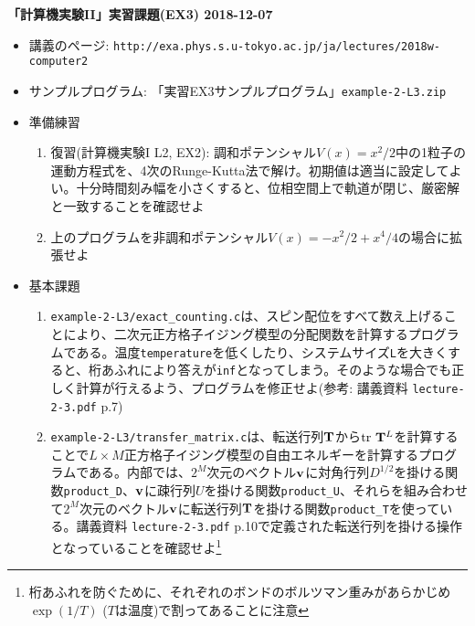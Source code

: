 \documentclass{jarticle}
\begin{document}
\noindent
{\bf\large 「計算機実験II」実習課題(EX3) 2018-12-07}
\\[-0.5em]

\noindent
\begin{itemize}
\item 講義のページ: \verb+http://exa.phys.s.u-tokyo.ac.jp/ja/lectures/2018w-computer2+

\item サンプルプログラム: 「実習EX3サンプルプログラム」{\tt example-2-L3.zip}

\item 準備練習


\begin{enumerate}
\item 復習(計算機実験I L2, EX2): 調和ポテンシャル$V(x)=x^2/2$中の1粒子の運動方程式を、4次のRunge-Kutta法で解け。初期値は適当に設定してよい。十分時間刻み幅を小さくすると、位相空間上で軌道が閉じ、厳密解と一致することを確認せよ
\item 上のプログラムを非調和ポテンシャル$V(x)=-x^2/2+x^4/4$の場合に拡張せよ
\end{enumerate}

\item 基本課題
  \begin{enumerate}
  \item {\tt example-2-L3/exact\_counting.c}は、スピン配位をすべて数え上げることにより、二次元正方格子イジング模型の分配関数を計算するプログラムである。温度{\tt temperature}を低くしたり、システムサイズ{\tt L}を大きくすると、桁あふれにより答えが{\tt inf}となってしまう。そのような場合でも正しく計算が行えるよう、プログラムを修正せよ(参考: 講義資料 {\tt lecture-2-3.pdf} p.7)
  \item {\tt example-2-L3/transfer\_matrix.c}は、転送行列${\bf T}$から${\rm tr}\ {\bf T}^L$を計算することで$L \times M$正方格子イジング模型の自由エネルギーを計算するプログラムである。内部では、$2^M$次元のベクトル${\bf v}$に対角行列$D^{1/2}$を掛ける関数{\tt product\_D}、${\bf v}$に疎行列$U$を掛ける関数{\tt product\_U}、それらを組み合わせて$2^M$次元のベクトル${\bf v}$に転送行列${\bf T}$を掛ける関数{\tt product\_T}を使っている。講義資料 {\tt lecture-2-3.pdf} p.10で定義された転送行列を掛ける操作となっていることを確認せよ\footnote{桁あふれを防ぐために、それぞれのボンドのボルツマン重みがあらかじめ$\exp(1/T)$ ($T$は温度)で割ってあることに注意}


\end{enumerate}
\end{itemize}
\end{document}
